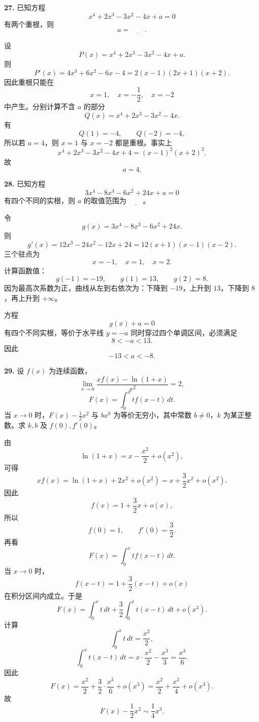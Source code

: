 \begin{problemblock}
\textbf{27.} 已知方程
\[
x^4+2x^3-3x^2-4x+a=0
\]
有两个重根，则
\[
a=\underline{\qquad}.
\]
\end{problemblock}

\begin{solutionblock}
设
\[
P(x)=x^4+2x^3-3x^2-4x+a.
\]
则
\[
P'(x)=4x^3+6x^2-6x-4
=2(x-1)(2x+1)(x+2).
\]
因此重根只能在
\[
x=1,\quad x=-\frac12,\quad x=-2
\]
中产生。分别计算不含 \(a\) 的部分
\[
Q(x)=x^4+2x^3-3x^2-4x.
\]
有
\[
Q(1)=-4,\qquad Q(-2)=-4,
\]
所以若 \(a=4\)，则 \(x=1\) 与 \(x=-2\) 都是重根。事实上
\[
x^4+2x^3-3x^2-4x+4=(x-1)^2(x+2)^2.
\]
故
\[
a=4.
\]
\end{solutionblock}

\begin{problemblock}
\textbf{28.} 已知方程
\[
3x^4-8x^3-6x^2+24x+a=0
\]
有四个不同的实根，则 \(a\) 的取值范围为 \(\underline{\qquad}\)。
\end{problemblock}

\begin{solutionblock}
令
\[
g(x)=3x^4-8x^3-6x^2+24x.
\]
则
\[
g'(x)=12x^3-24x^2-12x+24
=12(x+1)(x-1)(x-2).
\]
三个驻点为
\[
x=-1,\quad x=1,\quad x=2.
\]
计算函数值：
\[
g(-1)=-19,\qquad g(1)=13,\qquad g(2)=8.
\]
因为最高次系数为正，曲线从左到右依次为：下降到 \(-19\)，上升到 \(13\)，下降到 \(8\)，再上升到 \(+\infty\)。

方程
\[
g(x)+a=0
\]
有四个不同实根，等价于水平线 \(y=-a\) 同时穿过四个单调区间，必须满足
\[
8<-a<13.
\]
因此
\[
-13<a<-8.
\]
\end{solutionblock}

\begin{problemblock}
\textbf{29.} 设 \(f(x)\) 为连续函数，
\[
\lim_{x\to0}\frac{xf(x)-\ln(1+x)}{x^2}=2,
\]
\[
F(x)=\int_0^x t f(x-t)\,dt.
\]
当 \(x\to0\) 时，\(F(x)-\frac12x^2\) 与 \(bx^k\) 为等价无穷小，其中常数 \(b\ne0\)，\(k\) 为某正整数。求 \(k,b\) 及 \(f(0),f'(0)\)。
\end{problemblock}

\begin{solutionblock}
由
\[
\ln(1+x)=x-\frac{x^2}{2}+o(x^2),
\]
可得
\[
xf(x)=\ln(1+x)+2x^2+o(x^2)
=x+\frac32x^2+o(x^2).
\]
因此
\[
f(x)=1+\frac32x+o(x),
\]
所以
\[
f(0)=1,\qquad f'(0)=\frac32.
\]
再看
\[
F(x)=\int_0^x t f(x-t)\,dt.
\]
当 \(x\to0\) 时，
\[
f(x-t)=1+\frac32(x-t)+o(x)
\]
在积分区间内成立。于是
\[
F(x)=\int_0^x t\,dt
+\frac32\int_0^x t(x-t)\,dt
+o(x^3).
\]
计算
\[
\int_0^x t\,dt=\frac{x^2}{2},
\]
\[
\int_0^x t(x-t)\,dt
=x\cdot\frac{x^2}{2}-\frac{x^3}{3}
=\frac{x^3}{6}.
\]
因此
\[
F(x)=\frac{x^2}{2}+\frac32\cdot\frac{x^3}{6}+o(x^3)
=\frac{x^2}{2}+\frac{x^3}{4}+o(x^3).
\]
故
\[
F(x)-\frac12x^2\sim\frac14x^3.
\]
\end{solutionblock}

